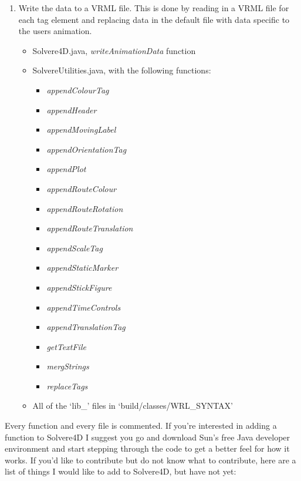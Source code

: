 \documentclass[singlecolumn,12pt]{article}
\begin{document}
\begin{enumerate}
\item Write the data to a VRML file. This is done by reading in a
VRML file for each tag element and replacing data in the default
file with data specific to the users animation.
\begin{itemize}
\item Solvere4D.java, \emph{writeAnimationData} function
\item SolvereUtilities.java, with the following functions:
\begin{itemize}
\item \emph{appendColourTag}
\item \emph{appendHeader}
\item \emph{appendMovingLabel}
\item \emph{appendOrientationTag}
\item \emph{appendPlot}
\item \emph{appendRouteColour}
\item \emph{appendRouteRotation}
\item \emph{appendRouteTranslation}
\item \emph{appendScaleTag}
\item \emph{appendStaticMarker}
\item \emph{appendStickFigure}
\item \emph{appendTimeControls}
\item \emph{appendTranslationTag}
\item \emph{getTextFile}
\item \emph{mergStrings}
\item \emph{replaceTags}
\end{itemize}
\item All of the `lib\_' files in `build/classes/WRL\_SYNTAX'
\end{itemize}
\end{enumerate}

Every function and every file is commented. If you're interested in
adding a function to Solvere4D I suggest you go and download Sun's
free Java developer environment and start stepping through the code
to get a better feel for how it works. If you'd like to contribute
but do not know what to contribute, here are a list of things I
would like to add to Solvere4D, but have not yet:
\end{document}
